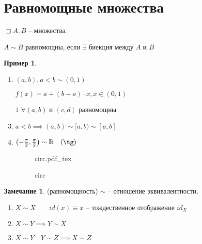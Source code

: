 \documentclass{book}
\newcommand\R{\ensuremath{\mathbb{R}}}
\newcommand{\ov}[1]{\overline{#1}}
\theoremstyle{definition}
\newtheorem*{note}{Замечание}
\newtheorem*{example}{Пример}
\newcommand{\incfig}[1]{%
    \def\svgwidth{\columnwidth}
    {#1.pdf_tex}
}
\begin{document}
    \section{Равномощные множества}

    \begin{definition}
        $\sqsupset A,B$ -- множества.

        $A\sim B$ равномощны, если $\exists $ биекция между $A$ и $B$
    \end{definition}
    \begin{example}
        \begin{enumerate}
            \item $(a,b), a<b \sim (0,1)$

                $f(x) = a+(b-a)\cdot x, x\in (0,1)$
            \item [$\ov{1}$] $\forall (a,b)$ и $(c,d)$ равномощны
            \item $a<b \implies (a,b)\sim [a,b) \sim [a,b]$
            \item $\left( -\frac{\pi}{2}, \frac{\pi }{2} \right) \sim \R\quad (\tg)$
\begin{figure}[ht]
    \centering
    \incfig{circ}
    \caption{circ}
    \label{fig:circ}
\end{figure}
        \end{enumerate}
    \end{example}

    \begin{note}
        (равномощность) $\sim $ -- отношение эквивалентности.

        \begin{enumerate}
            \item $X\sim X\qquad id(x) \equiv x$ -- тождественное отображение $id_X$
            \item $X\sim Y \implies  Y\sim X$
            \item $X\sim Y\quad Y\sim Z \implies X\sim Z$
        \end{enumerate}
    \end{note}
\end{document}
